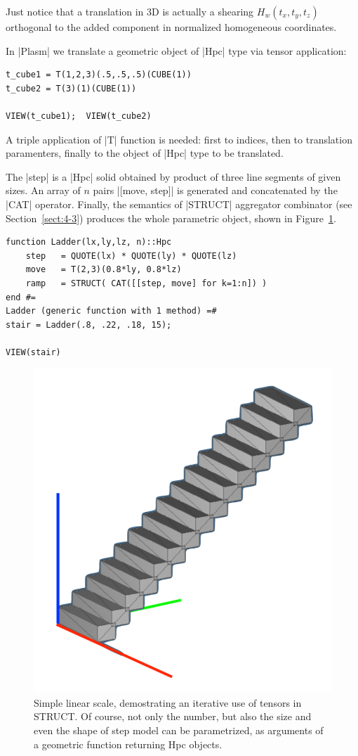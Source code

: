 \begin{coding}
Just notice that a translation in 3D is actually a shearing $H_w(t_x,t_y,t_z)$ orthogonal to the added component in normalized homogeneous coordinates.

\begin{coding} 
In |Plasm| we translate a geometric object of |Hpc| type via tensor application:

\begin{lstlisting}[language=JuliaLocal, style=julia, mathescape=true]
t_cube1 = T(1,2,3)(.5,.5,.5)(CUBE(1))
t_cube2 = T(3)(1)(CUBE(1))

VIEW(t_cube1);  VIEW(t_cube2)
\end{lstlisting}
A triple application of |T| function is needed: first to indices, then to translation paramenters, finally to the object of |Hpc| type to be translated.
\end{coding}

\begin{coding} 
The |step| is a |Hpc| solid obtained by product of three line segments of given sizes.
An array of $n$ pairs |[move, step]| is generated and concatenated by the |CAT| operator.  Finally, the semantics of |STRUCT| aggregator combinator (see Section~\ref{sect:4-3}) produces the whole parametric object, shown in Figure~\ref{fig:stair}. 

\begin{lstlisting}[language=JuliaLocal, style=julia, mathescape=true]
function Ladder(lx,ly,lz, n)::Hpc
	step   = QUOTE(lx) * QUOTE(ly) * QUOTE(lz)
	move   = T(2,3)(0.8*ly, 0.8*lz)
	ramp   = STRUCT( CAT([[step, move] for k=1:n]) )
end #=
Ladder (generic function with 1 method)	=#
stair = Ladder(.8, .22, .18, 15);

VIEW(stair)
\end{lstlisting}

\end{coding}



\begin{figure}[htbp] %
   \includegraphics[width=0.35\linewidth]{chapter-04/figs/stair}
   \hspace{5mm}
   \sidecaption[t]
   \caption{Simple linear scale, demostrating an iterative use of tensors in {\small\sf STRUCT}. Of course, not only the number, but also the size and even the shape of {\sf step} model can be parametrized, as arguments of a geometric function returning {\sf Hpc} objects.}
   \label{fig:stair}
\end{figure}  







\end{coding}
